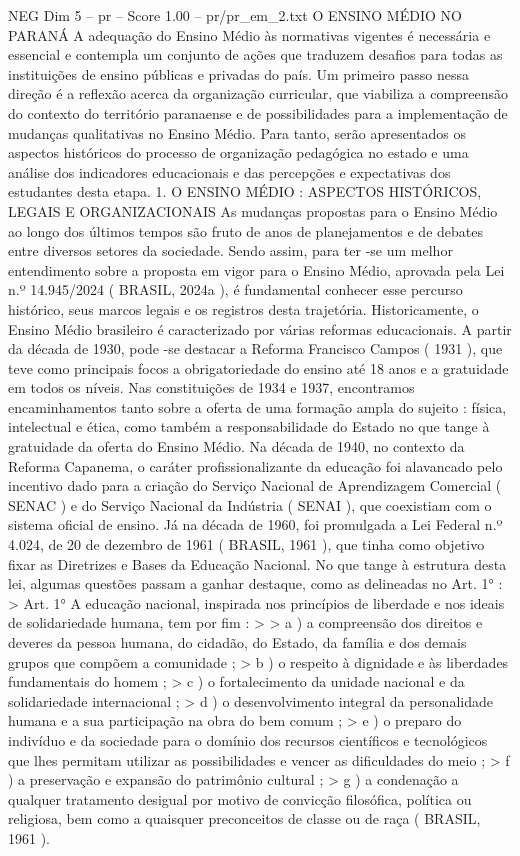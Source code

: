 \begin{textsample}{NEG Dim 5 – pr – Score 1.00 – pr/pr\_em\_2.txt}  \label{ex:f5_neg_236}
O ENSINO MÉDIO NO PARANÁ A adequação do Ensino Médio às normativas vigentes é necessária e essencial e contempla um conjunto de ações que traduzem desafios para todas as instituições de ensino públicas e privadas do país.
Um primeiro passo nessa direção é a reflexão acerca da organização curricular, que viabiliza a compreensão do contexto do território paranaense e de possibilidades para a implementação de mudanças qualitativas no Ensino Médio.
Para tanto, serão apresentados os aspectos históricos do processo de organização pedagógica no estado e uma análise dos indicadores educacionais e das percepções e expectativas dos estudantes desta etapa. 1.
O ENSINO MÉDIO : ASPECTOS HISTÓRICOS, LEGAIS E ORGANIZACIONAIS As mudanças propostas para o Ensino Médio ao longo dos últimos tempos são fruto de anos de planejamentos e de debates entre diversos setores da sociedade.
Sendo assim, para ter -se um melhor entendimento sobre a proposta em vigor para o Ensino Médio, aprovada pela Lei n.º 14.945/2024 ( BRASIL, 2024a ), é fundamental conhecer esse percurso histórico, seus marcos legais e os registros desta trajetória.
Historicamente, o Ensino Médio brasileiro é caracterizado por várias reformas educacionais.
A partir da década de 1930, pode -se destacar a Reforma Francisco Campos ( 1931 ), que teve como principais focos a obrigatoriedade do ensino até 18 anos e a gratuidade em todos os níveis.
Nas constituições de 1934 e 1937, encontramos encaminhamentos tanto sobre a oferta de uma formação ampla do sujeito : física, intelectual e ética, como também a responsabilidade do Estado no que tange à gratuidade da oferta do Ensino Médio.
Na década de 1940, no contexto da Reforma Capanema, o caráter profissionalizante da educação foi alavancado pelo incentivo dado para a criação do Serviço Nacional de Aprendizagem Comercial ( SENAC ) e do Serviço Nacional da Indústria ( SENAI ), que coexistiam com o sistema oficial de ensino.
Já na década de 1960, foi promulgada a Lei Federal n.º 4.024, de 20 de dezembro de 1961 ( BRASIL, 1961 ), que tinha como objetivo fixar as Diretrizes e Bases da Educação Nacional.
No que tange à estrutura desta lei, algumas questões passam a ganhar destaque, como as delineadas no Art. 1{\EmojiFont °} : > Art. 1{\EmojiFont °} A educação nacional, inspirada nos princípios de liberdade e nos ideais de solidariedade humana, tem por fim : > > a ) a compreensão dos direitos e deveres da pessoa humana, do cidadão, do Estado, da família e dos demais grupos que compõem a comunidade ; > b ) o respeito à dignidade e às liberdades fundamentais do homem ; > c ) o fortalecimento da unidade nacional e da solidariedade internacional ; > d ) o desenvolvimento integral da personalidade humana e a sua participação na obra do bem comum ; > e ) o preparo do indivíduo e da sociedade para o domínio dos recursos científicos e tecnológicos que lhes permitam utilizar as possibilidades e vencer as dificuldades do meio ; > f ) a preservação e expansão do patrimônio cultural ; > g ) a condenação a qualquer tratamento desigual por motivo de convicção filosófica, política ou religiosa, bem como a quaisquer preconceitos de classe ou de raça ( BRASIL, 1961 ).

\end{textsample}

